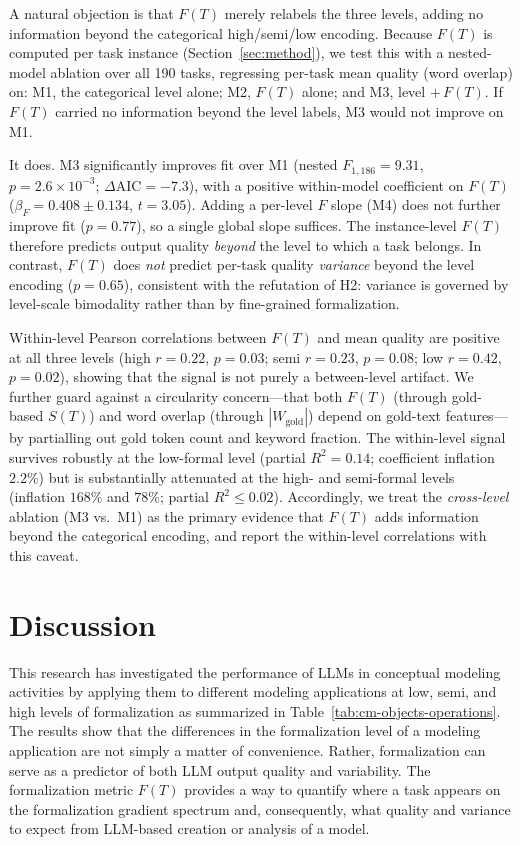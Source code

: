 \documentclass[runningheads]{llncs}
\begin{document}
A natural objection is that $F(T)$ merely relabels the three levels, adding no information beyond the categorical high/semi/low encoding. Because $F(T)$ is computed per task instance (Section~\ref{sec:method}), we test this with a nested-model ablation over all 190 tasks, regressing per-task mean quality (word overlap) on: M1, the categorical level alone; M2, $F(T)$ alone; and M3, level $+\,F(T)$. If $F(T)$ carried no information beyond the level labels, M3 would not improve on M1.

It does. M3 significantly improves fit over M1 (nested $F_{1,186}=9.31$, $p=2.6\times10^{-3}$; $\Delta\text{AIC}=-7.3$), with a positive within-model coefficient on $F(T)$ ($\beta_F=0.408 \pm 0.134$, $t=3.05$). Adding a per-level $F$ slope (M4) does not further improve fit ($p=0.77$), so a single global slope suffices. The instance-level $F(T)$ therefore predicts output quality \emph{beyond} the level to which a task belongs. In contrast, $F(T)$ does \emph{not} predict per-task quality \emph{variance} beyond the level encoding ($p=0.65$), consistent with the refutation of H2: variance is governed by level-scale bimodality rather than by fine-grained formalization.

Within-level Pearson correlations between $F(T)$ and mean quality are positive at all three levels (high $r=0.22$, $p=0.03$; semi $r=0.23$, $p=0.08$; low $r=0.42$, $p=0.02$), showing that the signal is not purely a between-level artifact. We further guard against a circularity concern---that both $F(T)$ (through gold-based $S(T)$) and word overlap (through $|W_{\text{gold}}|$) depend on gold-text features---by partialling out gold token count and keyword fraction. The within-level signal survives robustly at the low-formal level (partial $R^2=0.14$; coefficient inflation $2.2\%$) but is substantially attenuated at the high- and semi-formal levels (inflation $168\%$ and $78\%$; partial $R^2 \leq 0.02$). Accordingly, we treat the \emph{cross-level} ablation (M3 vs.\ M1) as the primary evidence that $F(T)$ adds information beyond the categorical encoding, and report the within-level correlations with this caveat.

\section{Discussion}
\label{sec:discussion}

This research has investigated the performance of LLMs in conceptual modeling activities by applying them to different modeling applications at low, semi, and high levels of formalization as summarized in Table~\ref{tab:cm-objects-operations}. The results show that the differences in the formalization level of a modeling application are not simply a matter of convenience. Rather, formalization can serve as a predictor of both LLM output quality and variability. The formalization metric $F(T)$ provides a way to quantify where a task appears on the formalization gradient spectrum and, consequently, what quality and variance to expect from LLM-based creation or analysis of a model.
\end{document}
